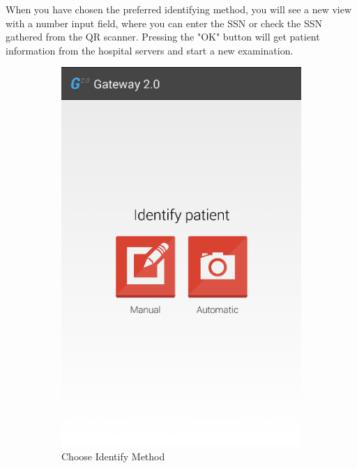 When you have chosen the preferred identifying method, you will see a new view with a number input field, where you can enter the SSN or check the SSN gathered from the QR scanner. Pressing the "OK" button will get patient information from the hospital servers and start a new examination.

\begin{figure}[H]
\centering
    \begin{subfigure}[b]{0.49\textwidth}
        \includegraphics[width=\textwidth]{img/interface/2-Identify1.png}
        \caption*{Choose Identify Method}
        \label{fig:02identify}
    \end{subfigure}
    \begin{subfigure}[b]{0.49\textwidth}

\end{subfigure}
\end{figure}
